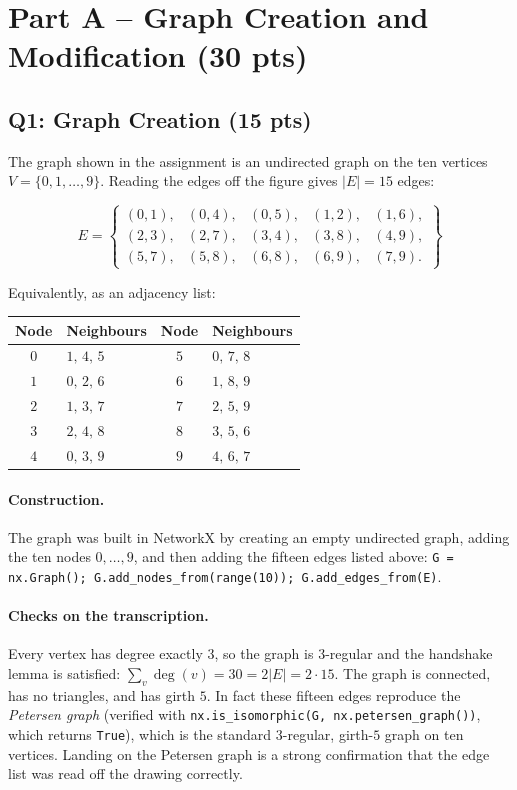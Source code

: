 \section*{Part A -- Graph Creation and Modification (30 pts)}

\subsection*{Q1: Graph Creation (15 pts)}

The graph shown in the assignment is an undirected graph on the ten vertices
$V=\{0,1,\dots,9\}$. Reading the edges off the figure gives $|E|=15$ edges:

\[
E=\left\{
\begin{array}{lllll}
(0,1), & (0,4), & (0,5), & (1,2), & (1,6),\\
(2,3), & (2,7), & (3,4), & (3,8), & (4,9),\\
(5,7), & (5,8), & (6,8), & (6,9), & (7,9).
\end{array}
\right\}
\]

Equivalently, as an adjacency list:

\begin{center}
\begin{tabular}{cl@{\qquad}cl}
\toprule
Node & Neighbours & Node & Neighbours \\
\midrule
$0$ & $1,\,4,\,5$ & $5$ & $0,\,7,\,8$ \\
$1$ & $0,\,2,\,6$ & $6$ & $1,\,8,\,9$ \\
$2$ & $1,\,3,\,7$ & $7$ & $2,\,5,\,9$ \\
$3$ & $2,\,4,\,8$ & $8$ & $3,\,5,\,6$ \\
$4$ & $0,\,3,\,9$ & $9$ & $4,\,6,\,7$ \\
\bottomrule
\end{tabular}
\end{center}

\paragraph{Construction.} The graph was built in NetworkX by creating an empty
undirected graph, adding the ten nodes $0,\dots,9$, and then adding the fifteen
edges listed above:
\texttt{G = nx.Graph(); G.add\_nodes\_from(range(10));
G.add\_edges\_from(E)}.

\paragraph{Checks on the transcription.} Every vertex has degree exactly $3$, so
the graph is $3$-regular and the handshake lemma is satisfied:
$\sum_{v} \deg(v) = 30 = 2|E| = 2\cdot 15$. The graph is connected, has no
triangles, and has girth $5$. In fact these fifteen edges reproduce the
\emph{Petersen graph} (verified with
\texttt{nx.is\_isomorphic(G, nx.petersen\_graph())}, which returns
\texttt{True}), which is the standard $3$-regular, girth-$5$ graph on ten
vertices. Landing on the Petersen graph is a strong confirmation that the edge
list was read off the drawing correctly.

